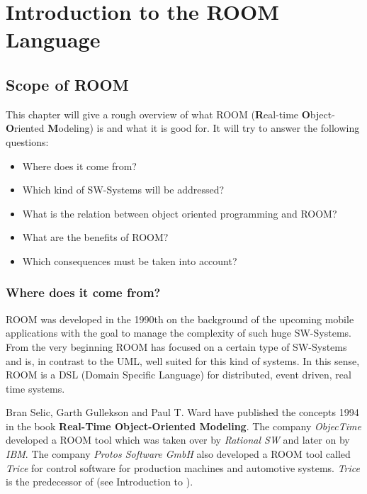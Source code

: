 \section{Introduction to the ROOM Language}

\subsection{Scope of ROOM}

This chapter will give a rough overview of what ROOM (\textbf{R}eal-time
\textbf{O}bject-\textbf{O}riented \textbf{M}odeling) is and what it is good for.
It will try to answer the following questions:

\begin{itemize}
\item Where does it come from?
\item Which kind of SW-Systems will be addressed?
\item What is the relation between object oriented programming and ROOM?
\item What are the benefits of ROOM?
\item Which consequences must be taken into account?
\end{itemize}

\subsubsection*{Where does it come from?}

ROOM was developed in the 1990th on the background of the upcoming mobile applications with the goal to
manage the complexity of such huge SW-Systems. From the very beginning ROOM has focused on a certain type
of SW-Systems and is, in contrast to the UML, well suited for this kind of systems. In this sense, ROOM is
a DSL (Domain Specific Language) for distributed, event driven, real time systems. 

Bran Selic, Garth Gullekson and Paul T. Ward have published the concepts 1994 in the book
\textbf{Real-Time Object-Oriented Modeling}. The company \textit{ObjecTime}\texttrademark{}
developed a ROOM tool which was taken over by \textit{Rational SW}\texttrademark{} and later
on by \textit{IBM}\texttrademark.
The company \textit{Protos Software GmbH}\texttrademark{} also developed a ROOM tool called
\textit{Trice}\texttrademark{} for control software for production machines and automotive systems.
\textit{Trice}\texttrademark{} is the predecessor of \eTrice{} (see Introduction to \eTrice{}). 
 

